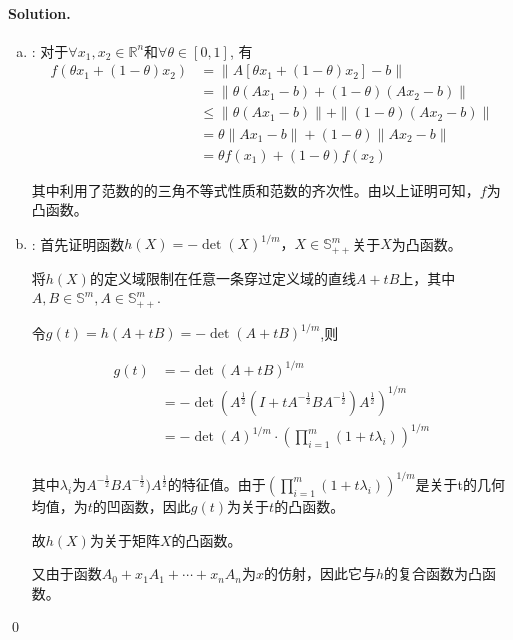 \documentclass[a4paper]{article}
\newenvironment{solution}
{\color{blue} \paragraph{Solution.}}
{\newline \qed}
\begin{document}
\begin{solution}
    \begin{enumerate}[a)]
        \item : 对于$\forall x_1, x_2\in \mathbb{R}^n $和$ \forall \theta \in [0, 1]$, 有
        \begin{equation}
        \begin{aligned}
            f(\theta x_1+(1-\theta)x_2) 
            &=\|A[\theta x_1+(1-\theta) x_2]-b\|\\
            &=\|\theta (Ax_1-b)+(1-\theta)(Ax_2-b)\|\\
            &\leq \|\theta (Ax_1-b)\|+\|(1-\theta)(Ax_2-b)\|\\
            &=\theta\|Ax_1-b\|+(1-\theta)\|Ax_2-b\|\\
            &=\theta f(x_1)+(1-\theta)f(x_2)
        \end{aligned}
        \end{equation}

        其中利用了范数的的三角不等式性质和范数的齐次性。由以上证明可知，$f$为凸函数。

        \item : 首先证明函数$h(X)=-\det(X)^{1/m}，X\in\mathbb{S}_{++}^m$关于$X$为凸函数。
        
                将$h(X)$的定义域限制在任意一条穿过定义域的直线$A+tB$上，其中$A,B\in \mathbb{S}^m, A\in \mathbb{S}_{++}^{m}$.

                令$g(t)=h(A+tB)=-\det(A+tB)^{1/m}$,则

                \begin{equation}
                \begin{aligned}
                    g(t)&=-\det(A+tB)^{1/m}\\
                    &=-\det(A^{\frac 12}(I+tA^{-\frac 12}BA^{-\frac 12})A^{\frac 12})^{1/m}\\
                    &=-\det(A)^{1/m}\cdot (\prod_{i=1}^{m}(1+t\lambda_i))^{1/m}\\
                \end{aligned}
                \end{equation}

                其中$\lambda_i$为$A^{-\frac 12}BA^{-\frac 12})A^{\frac 12}$的特征值。由于$(\prod_{i=1}^{m}(1+t\lambda_i))^{1/m}$是关于t的几何均值，为$t$的凹函数，因此$g(t)$为关于$t$的凸函数。

                故$h(X)$为关于矩阵$X$的凸函数。
                
                又由于函数$A_0+x_1A_1+\cdots+x_nA_n$为$x$的仿射，因此它与$h$的复合函数为凸函数。


\end{enumerate}
\end{solution}
\end{document}
